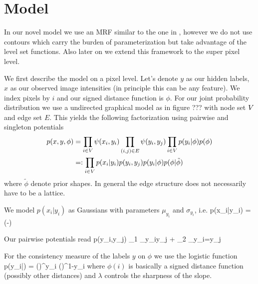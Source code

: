 \documentclass{article} %
\begin{document}
\section{Model}

In our novel model we use an MRF similar to the one in \cite{Huang04_MRFDM}, however we do not use contours which carry the burden of parameterization but take advantage of the level set functions. Also later on we extend this framework to the super pixel level.

We first describe the model on a pixel level. Let's denote $y$ as our hidden labels, $x$ as our observed image intensities (in principle this can be any feature). We index pixels by $i$ and our signed distance function is $\phi$. For our joint probability distribution we use a undirected graphical model as in figure ??? with node set $V$ and edge set $E$. 
This yields the following factorization using pairwise and singleton potentials 
\begin{align}
p(x,y,\phi) &=  \prod_{i\in V} \psi(x_i,y_i)  \prod_{(i,j)\in E} \psi(y_i,y_j)\prod_{i\in V} p(y_i|\phi)p(\phi) \label{total_joint}\\
&=: \prod_{i\in V} p(x_i|y_i)p(y_i,y_j)p(y_i|\phi)p(\phi|\tilde{\phi})\nonumber
\end{align}
where $\tilde{\phi}$ denote prior shapes.
In general the edge structure does not necessarily have to be a lattice.

We model $p(x_i|y_i)$ as Gaussians with parameters $\mu_{y_i}$ and $\sigma_{y_i}$, i.e. 
\beqs
p(x_i|y_i) = \exp(-)
\eeqs

Our pairwise potentials read
\beqs
p(y_i,y_j) \propto \theta_1 \Indi_{y_i\neq y_j} + \theta_2 \Indi_{y_i=y_j}
\eeqs

For the consistency measure of the labels $y$ on $\phi$ we use the logistic function
\beqs
p(y_i|\phi) = \left(\right)^{y_i} \left(\right)^{1-y_i}
\eeqs
where $\phi(i)$ is basically a signed distance function (possibly other distances) and $\lambda$ controls the sharpness of the slope. 
\end{document}
